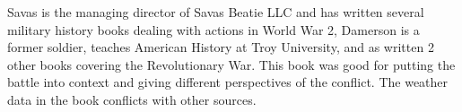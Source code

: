 Savas is the managing director of Savas Beatie LLC and has written several
military history books dealing with actions in World War 2, Damerson is a
former soldier, teaches American History at Troy University, and as written 2
other books covering the Revolutionary War.  This book was good for putting the
battle into context and giving different perspectives of the conflict.  The
weather data in the book conflicts with other sources.
